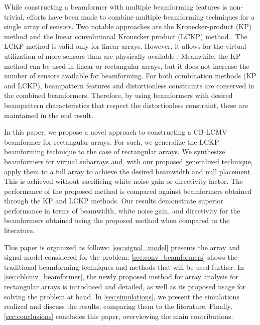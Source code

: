 While constructing a beamformer with multiple beamforming features is non-trivial, efforts have been made to combine multiple beamforming techniques for a single array of sensors. Two notable approaches are the Kronecker-product (KP) method \cite{abramovich_iterative_2010,werner_estimation_2008} and the linear convolutional Kronecker product (LCKP) method \cite{frank_constant-beamwidth_2022-1}. The LCKP method is valid only for linear arrays. However, it allows for the virtual utilization of more sensors than are physically available \cite{frank_constant-beamwidth_2022-1}. Meanwhile, the KP method can be used in linear or rectangular arrays, but it does not increase the number of sensors available for beamforming. For both combination methods (KP and LCKP), beampattern features and distortionless constraints are conserved in the combined beamformers. Therefore, by using beamformers with desired beampattern characteristics that respect the distortionless constraint, these are maintained in the end result.

In this paper, we propose a novel approach to constructing a CB-LCMV beamformer for rectangular arrays.
For such, we generalize the LCKP beamforming technique to the case of rectangular arrays. We synthesize beamformers for virtual subarrays and, with our proposed generalized technique, apply them to a full array to achieve the desired beamwidth and null placement. This is achieved without sacrificing white noise gain or directivity factor. The performance of the proposed method is compared against beamformers obtained through the KP and LCKP methods. Our results demonstrate superior performance in terms of beamwidth, white noise gain, and directivity for the beamformers obtained using the proposed method when compared to the literature.

This paper is organized as follows: \cref{sec:signal_model} presents the array and signal model considered for the problem;
\cref{sec:conv_beamformers} shows the traditional beamforming techniques and methods that will be used further.
In \cref{sec:cblcmv_beamformer}, the newly proposed method for array analysis for rectangular arrays is introduced and detailed, as well as its proposed usage for solving the problem at hand. In \cref{sec:simulations}, we present the simulations realized and discuss the results, comparing them to the literature. Finally, \cref{sec:conclusions} concludes this paper, overviewing the main contributions.